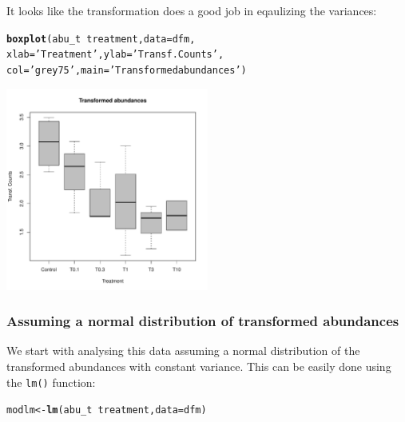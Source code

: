 \documentclass{scrartcl}\usepackage[]{graphicx}\usepackage[]{color}
\makeatletter
\newcommand{\hlstr}[1]{\textcolor[rgb]{0.192,0.494,0.8}{#1}}%
\newcommand{\hlopt}[1]{\textcolor[rgb]{0,0,0}{#1}}%
\newcommand{\hlstd}[1]{\textcolor[rgb]{0.345,0.345,0.345}{#1}}%
\newcommand{\hlkwb}[1]{\textcolor[rgb]{0.69,0.353,0.396}{#1}}%
\newcommand{\hlkwc}[1]{\textcolor[rgb]{0.333,0.667,0.333}{#1}}%
\newcommand{\hlkwd}[1]{\textcolor[rgb]{0.737,0.353,0.396}{\textbf{#1}}}%
\newenvironment{kframe}{%
 \def\at@end@of@kframe{}%
 \ifinner\ifhmode%
  \def\at@end@of@kframe{\end{minipage}}%
  \begin{minipage}{\columnwidth}%
 \fi\fi%
 \def\FrameCommand##1{\hskip\@totalleftmargin \hskip-\fboxsep
 \colorbox{shadecolor}{##1}\hskip-\fboxsep
     \hskip-\linewidth \hskip-\@totalleftmargin \hskip\columnwidth}%
 \MakeFramed {\advance\hsize-\width
   \@totalleftmargin\z@ \linewidth\hsize
   \@setminipage}}%
 {\par\unskip\endMakeFramed%
 \at@end@of@kframe}
\newenvironment{knitrout}{}{} %
\makeatother
\begin{document}
It looks like the transformation does a good job in eqaulizing the variances:
\begin{knitrout}
\color{fgcolor}\begin{kframe}
\begin{alltt}
\hlkwd{boxplot}\hlstd{(abu_t} \hlopt{~} \hlstd{treatment,} \hlkwc{data} \hlstd{= dfm,}
        \hlkwc{xlab} \hlstd{=} \hlstr{'Treatment'}\hlstd{,} \hlkwc{ylab} \hlstd{=} \hlstr{'Transf. Counts'}\hlstd{,}
        \hlkwc{col} \hlstd{=} \hlstr{'grey75'}\hlstd{,} \hlkwc{main} \hlstd{=} \hlstr{'Transformed abundances'}\hlstd{)}
\end{alltt}
\end{kframe}
\includegraphics[width=0.5\textwidth]{figure/plot_count_trans-1} 

\end{knitrout}


\subsubsection{Assuming a normal distribution of transformed abundances}
We start with analysing this data assuming a normal distribution of the transformed abundances with constant variance.
This can be easily done using the \texttt{lm()} function:

\begin{knitrout}
\color{fgcolor}\begin{kframe}
\begin{alltt}
\hlstd{modlm} \hlkwb{<-} \hlkwd{lm}\hlstd{(abu_t} \hlopt{~} \hlstd{treatment,} \hlkwc{data} \hlstd{= dfm)}
\end{alltt}
\end{kframe}
\end{knitrout}
\end{document}
